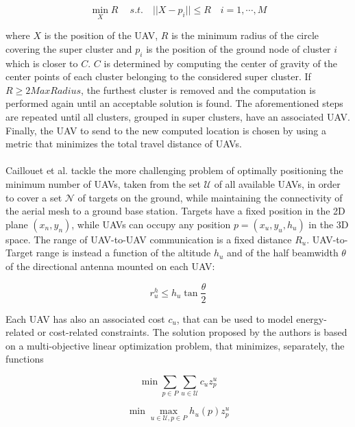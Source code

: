 \[\min_{X} R\ \quad s.t. \quad ||X-p_i|| \leq R \quad i=1,\cdots,M \]

where $X$ is the position of the \gls{UAV}, $R$ is the minimum radius of the circle covering the super cluster and $p_i$ is the position of the ground node of cluster $i$ which is closer to $C$. $C$ is determined by computing the center of gravity of the center points of each cluster belonging to the considered super cluster. If $R \geq 2MaxRadius$, the furthest cluster is removed and the computation is performed again until an acceptable solution is found. The aforementioned steps are repeated until all clusters, grouped in super clusters, have an associated \gls{UAV}. Finally, the \gls{UAV} to send to the new computed location is chosen by using a metric that minimizes the total travel distance of \glspl{UAV}. \\ \\
Caillouet et al. \cite{ref:soa-plac-centr2} tackle the more challenging problem of optimally positioning the minimum number of \glspl{UAV}, taken from the set $\mathcal{U}$ of all available \glspl{UAV}, in order to cover a set $\mathcal{N}$ of targets on the ground, while maintaining the connectivity of the aerial mesh to a ground base station. Targets have a fixed position in the 2D plane $(x_n, y_n)$, while \glspl{UAV} can occupy any position $p = (x_u, y_u, h_u)$ in the 3D space. The range of UAV-to-UAV communication is a fixed distance $R_u$. UAV-to-Target range is instead a function of the altitude $h_u$ and of the half beamwidth $\theta$ of the directional antenna mounted on each \gls{UAV}:

\[r_u^h \leq h_u \tan{\frac{\theta}{2}}\]

Each \gls{UAV} has also an associated cost $c_u$, that can be used to model energy-related or cost-related constraints. The solution proposed by the authors is based on a multi-objective linear optimization problem, that minimizes, separately, the functions

\begin{equation} \label{eq:lin-prob1}
	\min \sum\limits_{p \in P} \sum\limits_{u \in \mathcal{U}} c_u z_p^u
\end{equation}

\begin{equation} \label{eq:lin-prob2}
	\min \max_{u \in \mathcal{U}, p \in P} h_u(p) z_p^u
\end{equation}

